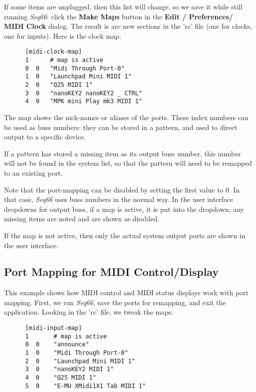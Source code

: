 
   If some items are unplugged, then this list will change, so we save it while
   still running \textsl{Seq66}:
   click the
   \textbf{Make Maps} button in the
   \textbf{Edit / Preferences/ MIDI Clock} dialog. 
   The result is are new sections in the 'rc' file (one for clocks, one for
   inputs).  Here is the clock map:

   \begin{verbatim}
      [midi-clock-map]
      1      # map is active
      0  0   "Midi Through Port-0"
      1  0   "Launchpad Mini MIDI 1"
      2  0   "Q25 MIDI 1"
      3  0   "nanoKEY2 nanoKEY2 _ CTRL"
      4  0   "MPK mini Play mk3 MIDI 1"
   \end{verbatim}
   
   The map shows the nick-names or aliases of the ports.
   These index numbers can be used as buss numbers: they can be stored
   in a pattern, and used to direct output to a specific device.

   If a pattern has stored a missing item as its output
   buss number, this number will not be found in the system list, so that the
   pattern will need to be remapped to an existing port.

   Note that the port-mapping can be disabled by setting the first value to 0.
   In that case, \textsl{Seq66} uses buss numbers in the normal way.
   In the user interface dropdowns for output buss, if a map is active, it is
   put into the dropdown; any missing items are noted and are shown as
   disabled.

   If the map is not active, then only the actual system output ports are
   shown in the user interface.

\subsection{Port Mapping for MIDI Control/Display}
\label{subsec:input_port_mapping_example}

   This example shows how MIDI control and MIDI status displays work with
   port mapping.  First, we run \textsl{Seq66}, save the ports for
   remapping, and exit the application.  Looking in the 'rc' file, we tweak
   the maps:

   \begin{verbatim}
      [midi-input-map]
      1       # map is active
      0  0    "announce"
      1  0    "Midi Through Port-0"
      2  0    "Launchpad Mini MIDI 1"
      3  0    "nanoKEY2 MIDI 1"
      4  0    "Q25 MIDI 1"
      5  0    "E-MU XMidi1X1 Tab MIDI 1"
   \end{verbatim}

